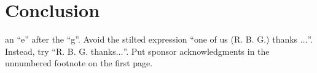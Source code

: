 \documentclass[conference]{IEEEtran}
\begin{document}
%



 \section{Conclusion} \label{sec:conclusion}



 an ``e'' after the ``g''. Avoid the stilted expression ``one of us (R. B. 
 G.) thanks $\ldots$''. Instead, try ``R. B. G. thanks$\ldots$''. Put sponsor 
 acknowledgments in the unnumbered footnote on the first page.



 

\end{document}
